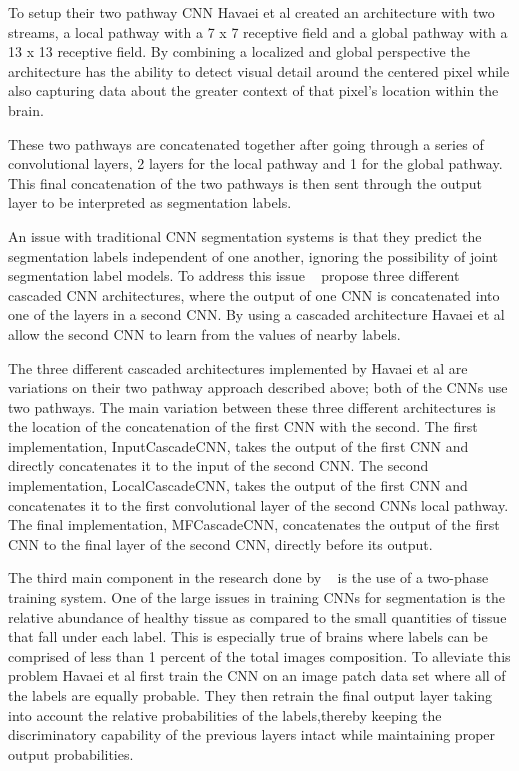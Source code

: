 \documentclass{sig-alternate}
\begin{document}
To setup their two pathway CNN Havaei et al created an architecture with two streams, a local pathway with a 7 x 7 receptive field and a global pathway with a 13 x 13 receptive field. By combining a localized and global perspective the architecture has the ability to detect visual detail around the centered pixel while also capturing data about the greater context of that pixel's location within the brain.

These two pathways are concatenated together after going through a series of convolutional layers, 2 layers for the local pathway and 1 for the global pathway. This final concatenation of the two pathways is then sent through the output layer to be interpreted as segmentation labels.

An issue with traditional CNN segmentation systems is that they predict the segmentation labels independent of one another, ignoring the possibility of joint segmentation label models. To address this issue ~\cite{Havaei:2017} propose three different cascaded CNN architectures, where the output of one CNN is concatenated into one of the layers in a second CNN. By using a cascaded architecture Havaei et al allow the second CNN to learn from the values of nearby labels.

The three different cascaded architectures implemented by Havaei et al are variations on their two pathway approach described above; both of the CNNs use two pathways. The main variation between these three different architectures is the location of the concatenation of the first CNN with the second. The first implementation, InputCascadeCNN, takes the output of the first CNN and directly concatenates it to the input of the second CNN. The second implementation, LocalCascadeCNN, takes the output of the first CNN and concatenates it to the first convolutional layer of the second CNNs local pathway. The final implementation, MFCascadeCNN, concatenates the output of the first CNN to the final layer of the second CNN, directly before its output.

The third main component in the research done by ~\cite{Havaei:2017} is the use of a two-phase training system. One of the large issues in training CNNs for segmentation is the relative abundance of healthy tissue as compared to the small quantities of tissue that fall under each label. This is especially true of brains where labels can be comprised of less than 1 percent of the total images composition. To alleviate this problem Havaei et al first train the CNN on an image patch data set where all of the labels are equally probable. They then retrain the final output layer taking into account the relative probabilities of the labels,thereby keeping the discriminatory capability of the previous layers intact while maintaining proper output probabilities.
\end{document}

